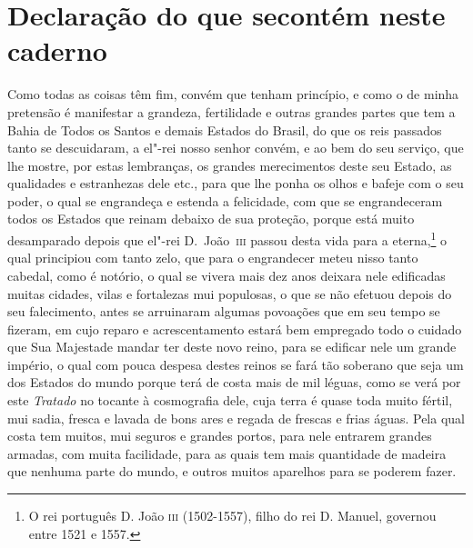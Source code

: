 \section[Declaração do que se contém neste caderno]{Declaração do que se\break contém
neste caderno}

\begin{linenumbers}

Como todas as coisas têm fim, convém que tenham princípio, e como o de minha pretensão é
manifestar a grandeza, fertilidade e outras grandes partes que tem a Bahia de Todos os
Santos e demais Estados do Brasil, do que os reis passados tanto se descuidaram, a el"-rei
nosso senhor convém, e ao bem do seu serviço, que lhe mostre, por estas lembranças, os
grandes merecimentos deste seu Estado, as qualidades e estranhezas dele etc., para que lhe
ponha os olhos e bafeje com o seu poder, o qual se engrandeça e estenda a felicidade, com
que se engrandeceram todos os Estados que reinam debaixo de sua proteção, porque está
muito desamparado depois que el"-rei D.~João~\textsc{iii} passou desta vida para a
eterna,\footnote{ O rei português D. João \textsc{iii} (1502-1557), filho do rei
D. Manuel, governou entre 1521 e 1557.} o qual principiou com tanto zelo, que para o
engrandecer meteu nisso tanto cabedal, como é notório, o qual se vivera mais dez anos
deixara nele edificadas muitas cidades, vilas e fortalezas mui populosas, o que se não
efetuou depois do seu falecimento, antes se arruinaram algumas povoações que em seu tempo
se fizeram, em cujo reparo e acrescentamento estará bem empregado todo o cuidado que Sua
Majestade mandar ter deste novo reino, para se edificar nele um grande império, o
qual com pouca despesa destes reinos se fará tão soberano que seja um dos Estados do mundo
porque terá de costa mais de mil léguas, como se verá por este \textit{Tratado} no tocante
à cosmografia dele, cuja terra é quase toda muito fértil, mui sadia, fresca e lavada de
bons ares e regada de frescas e frias águas. Pela qual costa tem muitos, mui seguros e
grandes portos, para nele entrarem grandes armadas, com muita facilidade, para as quais
tem mais quantidade de madeira que nenhuma parte do mundo, e outros muitos aparelhos para
se poderem fazer.


\end{linenumbers}
